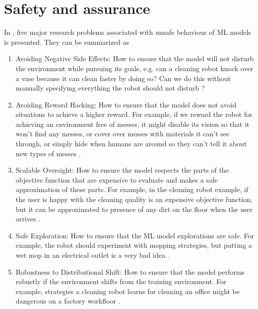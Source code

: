 \chapter{Safety and assurance}

In \cite{Amodei}, five major research problems associated with unsafe behaviour of ML models is presented. They can be summarized as
\begin{enumerate}
	\item Avoiding Negative Side Effects: How to ensure that the model will not disturb the environment while pursuing its goals, e.g. can a cleaning robot knock over a vase because it can clean faster by doing so? Can we do this without manually specifying everything the robot should not disturb \cite{Amodei}?
	
	\item Avoiding Reward Hacking: How to ensure that the model does not avoid situations to achieve a higher reward. For example, if we reward the robot for achieving an environment free of messes, it might disable its vision so that it won’t find any messes, or cover over messes with materials it can’t see through, or simply hide when humans are around so they can’t tell it about new types of messes \cite{Amodei}. 
	
	\item Scalable Oversight: How to ensure the model respects the parts of the objective function that are expensive to evaluate and makes a safe approximation of these parts. 
	For example, in the cleaning robot example, if the user is happy with the cleaning quality is an expensive objective function, but it can be approximated to presence of any dirt on the floor when the user arrives \cite{Amodei}. 
	
	\item Safe Exploration: How to ensure that the ML model explorations are safe. For example, the robot should experiment with mopping strategies, but putting a wet mop in an electrical outlet is a very bad idea \cite{Amodei}. 
	
	\item Robustness to Distributional Shift: How to ensure that the model performs robustly if the environment shifts from the training environment. For example, strategies a cleaning robot learns for cleaning an office might be dangerous on a factory workfloor \cite{Amodei}.

\end{enumerate}


